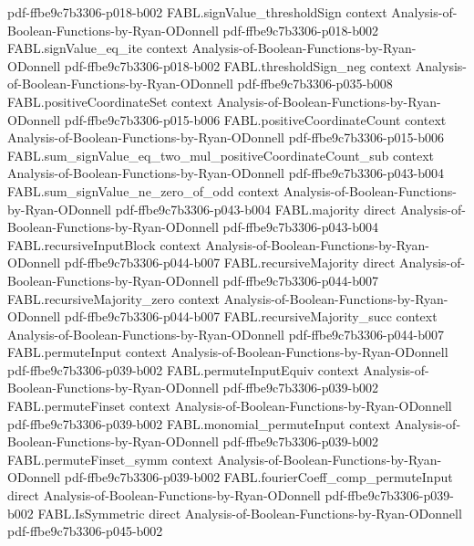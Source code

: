 \begin{theorem}
  {pdf-ffbe9c7b3306-p018-b002}
\proofstep
  {FABL.signValue_thresholdSign}
  {context}
  {Analysis-of-Boolean-Functions-by-Ryan-ODonnell}
  {pdf-ffbe9c7b3306-p018-b002}
\proofstep
  {FABL.signValue_eq_ite}
  {context}
  {Analysis-of-Boolean-Functions-by-Ryan-ODonnell}
  {pdf-ffbe9c7b3306-p018-b002}
\proofstep
  {FABL.thresholdSign_neg}
  {context}
  {Analysis-of-Boolean-Functions-by-Ryan-ODonnell}
  {pdf-ffbe9c7b3306-p035-b008}
\proofstep
  {FABL.positiveCoordinateSet}
  {context}
  {Analysis-of-Boolean-Functions-by-Ryan-ODonnell}
  {pdf-ffbe9c7b3306-p015-b006}
\proofstep
  {FABL.positiveCoordinateCount}
  {context}
  {Analysis-of-Boolean-Functions-by-Ryan-ODonnell}
  {pdf-ffbe9c7b3306-p015-b006}
\proofstep
  {FABL.sum_signValue_eq_two_mul_positiveCoordinateCount_sub}
  {context}
  {Analysis-of-Boolean-Functions-by-Ryan-ODonnell}
  {pdf-ffbe9c7b3306-p043-b004}
\proofstep
  {FABL.sum_signValue_ne_zero_of_odd}
  {context}
  {Analysis-of-Boolean-Functions-by-Ryan-ODonnell}
  {pdf-ffbe9c7b3306-p043-b004}
\proofstep
  {FABL.majority}
  {direct}
  {Analysis-of-Boolean-Functions-by-Ryan-ODonnell}
  {pdf-ffbe9c7b3306-p043-b004}
\proofstep
  {FABL.recursiveInputBlock}
  {context}
  {Analysis-of-Boolean-Functions-by-Ryan-ODonnell}
  {pdf-ffbe9c7b3306-p044-b007}
\proofstep
  {FABL.recursiveMajority}
  {direct}
  {Analysis-of-Boolean-Functions-by-Ryan-ODonnell}
  {pdf-ffbe9c7b3306-p044-b007}
\proofstep
  {FABL.recursiveMajority_zero}
  {context}
  {Analysis-of-Boolean-Functions-by-Ryan-ODonnell}
  {pdf-ffbe9c7b3306-p044-b007}
\proofstep
  {FABL.recursiveMajority_succ}
  {context}
  {Analysis-of-Boolean-Functions-by-Ryan-ODonnell}
  {pdf-ffbe9c7b3306-p044-b007}
\proofstep
  {FABL.permuteInput}
  {context}
  {Analysis-of-Boolean-Functions-by-Ryan-ODonnell}
  {pdf-ffbe9c7b3306-p039-b002}
\proofstep
  {FABL.permuteInputEquiv}
  {context}
  {Analysis-of-Boolean-Functions-by-Ryan-ODonnell}
  {pdf-ffbe9c7b3306-p039-b002}
\proofstep
  {FABL.permuteFinset}
  {context}
  {Analysis-of-Boolean-Functions-by-Ryan-ODonnell}
  {pdf-ffbe9c7b3306-p039-b002}
\proofstep
  {FABL.monomial_permuteInput}
  {context}
  {Analysis-of-Boolean-Functions-by-Ryan-ODonnell}
  {pdf-ffbe9c7b3306-p039-b002}
\proofstep
  {FABL.permuteFinset_symm}
  {context}
  {Analysis-of-Boolean-Functions-by-Ryan-ODonnell}
  {pdf-ffbe9c7b3306-p039-b002}
\proofstep
  {FABL.fourierCoeff_comp_permuteInput}
  {direct}
  {Analysis-of-Boolean-Functions-by-Ryan-ODonnell}
  {pdf-ffbe9c7b3306-p039-b002}
\proofstep
  {FABL.IsSymmetric}
  {direct}
  {Analysis-of-Boolean-Functions-by-Ryan-ODonnell}
  {pdf-ffbe9c7b3306-p045-b002}

\end{theorem}
